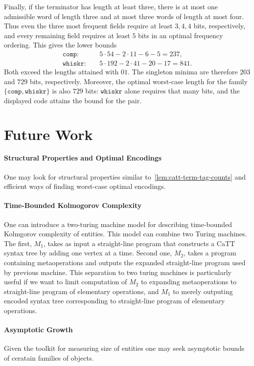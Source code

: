 \documentclass{article}%
\theoremstyle{remark}
\theoremstyle{definition}
\theoremstyle{definition}
\theoremstyle{plain}
\begin{document}
Finally, if the terminator has length at least three, there is at most one
admissible word of length three and at most three words of length at most four.
Thus even the three most frequent fields require at least $3,4,4$ bits,
respectively, and every remaining field requires at least $5$ bits in an optimal
frequency ordering. This gives the lower bounds
\[
\begin{aligned}
  \mathtt{comp}:   &\quad 5\cdot54-2\cdot11-6-5=237,\\
  \mathtt{whiskr}: &\quad 5\cdot192-2\cdot41-20-17=841.
\end{aligned}
\]
Both exceed the lengths attained with $01$. The singleton minima are therefore
$203$ and $729$ bits, respectively. Moreover, the optimal worst-case length for
the family $\{\mathtt{comp},\mathtt{whiskr}\}$ is also $729$ bits:
$\mathtt{whiskr}$ alone requires that many bits, and the displayed code attains
the bound for the pair.

\section{Future Work}
\paragraph{Structural Properties and Optimal Encodings}
One may look for structural properties similar to~\ref{lem:catt-term-tag-counts}
and efficient ways of finding worst-case optimal encodings.

\paragraph{Time-Bounded Kolmogorov Complexity}
One can introduce a two-turing machine model for describing time-bounded
Kolmgorov complexity of \catt entities. This model can combine two Turing
machines. The first, $M_1$, takes as input a straight-line program that
constructs a CaTT syntax tree by adding one vertex at a time. Second one, $M_2$,
takes a program containing metaoperations and outputs the expanded straight-line
program used by previous machine. This separation to two turing machines is
particularly useful if we want to limit computation of $M_2$ to expanding
metaoperations to straight-line program of elementary \catt operations, and
$M_1$ to merely outputing encoded syntax tree corresponding to
straight-line program of elementary \catt operations.

\paragraph{Asymptotic Growth}
Given the toolkit for measuring size of \catt entities one may seek asymptotic
bounds of ceratain families of objects.
\end{document}
